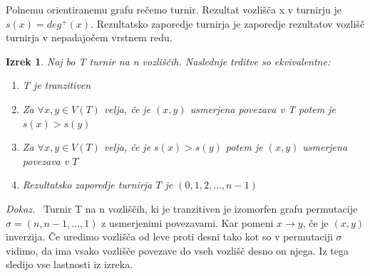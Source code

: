 \documentclass[a4paper, 12pt]{book}
\newtheorem{izrek}{Izrek}[chapter]
\newenvironment{dokaz}{\emph{Dokaz.}\ }{\hspace{\fill}{$\Box$}}
\begin{document}
Polnemu orientiranemu grafu rečemo turnir. Rezultat vozlišča x v turnirju je $s(x) = deg^+(x)$. Rezultatsko zaporedje turnirja je zaporedje rezultatov vozlišč turnirja v nepadajočem vrstnem redu.

\begin{izrek}
\label{izrek_tranzitiven_turnir}
    Naj bo T turnir na n vozliščih. Naslednje trditve so ekvivalentne:
    \begin{enumerate}
        \item T je tranzitiven
        \item Za $\forall x,y \in V(T)$ velja, če je $(x, y)$ usmerjena povezava v T potem je $s(x) > s(y)$
        \item Za $\forall x,y \in V(T)$  velja, če je $s(x) > s(y)$ potem je $(x, y)$ usmerjena povezava v $T$
        \item Rezultatsko zaporedje turnirja $T$ je $(0, 1, 2, ..., n-1)$
    \end{enumerate}
\end{izrek}
\begin{dokaz}
    Turnir T na n vozliščih, ki je tranzitiven je izomorfen grafu permutacije $\sigma = (n, n-1, ..., 1)$ z usmerjenimi povezavami. Kar pomeni $x \rightarrow y$, če je $(x, y)$ inverzija. Če uredimo vozlišča od leve proti desni tako kot so v permutaciji $\sigma$ vidimo, da ima vsako vozlišče povezave do vseh vozlišč desno on njega. Iz tega sledijo vse lastnosti iz izreka.
\end{dokaz}
\end{document}

